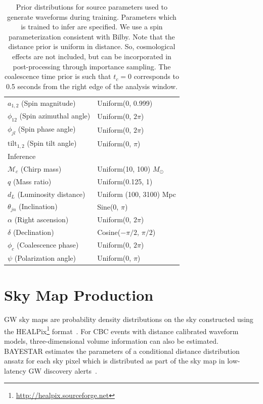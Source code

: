 \begin{refsection}
\begin{table}
\begin{tabular}{p{4.5cm} p{4.5cm}}
$a_{1,2}$ \hfill (Spin magnitude) & Uniform(0, 0.999) \\
$\phi_{12}$ \hfill (Spin azimuthal angle) & Uniform(0, $2\pi$) \\
$\phi_{jl}$ \hfill (Spin phase angle) & Uniform(0, $2\pi$) \\
$\text{tilt}_{1,2}$ \hfill (Spin tilt angle) & Uniform(0, $\pi$) \\
\hline
\multicolumn{2}{l}{Inference} \\
\hline
$\mathcal{M}_c$ \hfill (Chirp mass) & Uniform(10, 100) $M_{\odot}$ \\
$q$ \hfill (Mass ratio) & Uniform(0.125, 1) \\
$d_L$ \hfill (Luminosity distance) & Uniform (100, 3100) Mpc \\
$\theta_{jn}$ \hfill (Inclination) & Sine(0, $\pi$) \\
$\alpha$ \hfill (Right ascension) & Uniform(0, $2\pi$) \\
$\delta$ \hfill (Declination) & Cosine($-\pi/2$, $\pi/2$) \\
$\phi_c$ \hfill (Coalescence phase) & Uniform(0, $2\pi$) \\
$\psi$ \hfill (Polarization angle) & Uniform(0, $\pi$) \\
\hline
\hline
\end{tabular}
\caption[Prior distributions for source parameters used to generate waveforms during \amplfi training]{Prior distributions for source parameters used to generate waveforms during training. 
Parameters which \amplfi is trained to infer are specified. We use a spin parameterization consistent with Bilby. Note that the distance prior is uniform in distance. 
So, cosmological effects are not included, but can be incorporated in post-processing through importance sampling. 
The coalescence time prior is such that $t_c=0$ corresponds to 0.5 seconds from the right edge of the analysis window.}
\label{amp_res_tab:priors}
\end{table}

\section{Sky Map Production} \label{amp_res_sec:sky-localization}
GW sky maps are probability density distributions on the sky constructed using the HEALPix\footnote{\url{http://healpix.sourceforge.net}} format~\cite{Zonca2019}. 
For CBC events with distance calibrated waveform models, three-dimensional volume information can also be estimated. 
BAYESTAR estimates the parameters of a conditional distance distribution ansatz for each sky pixel which is distributed as part of the sky map in low-latency GW discovery alerts~\cite{Si2016}. 


\end{refsection}
